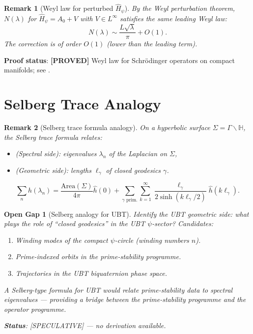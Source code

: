 \documentclass[11pt,a4paper]{article}
\newtheorem{remark}{Remark}
\newtheorem{gap}{Open Gap}
\newcommand{\proved}[1]{\textbf{[PROVED]} #1}
\begin{document}
\begin{remark}[Weyl law for perturbed $\hat{H}_\psi$]
  By the Weyl perturbation theorem, $N(\lambda)$ for $\hat{H}_\psi = A_0 + V$
  with $V \in L^\infty$ satisfies the same leading Weyl law:
  \[
    N(\lambda) \sim \frac{L\sqrt{\lambda}}{\pi} + O(1).
  \]
  The correction is of order $O(1)$ (lower than the leading term).
\end{remark}

\textbf{Proof status}: \proved{Weyl law for Schr\"odinger operators on compact
manifolds; see \cite[Ch.\ 13]{Berger}.}

\section{Selberg Trace Analogy}

\begin{remark}[Selberg trace formula analogy]
  On a hyperbolic surface $\Sigma = \Gamma\backslash\mathbb{H}$, the Selberg
  trace formula relates:
  \begin{itemize}
    \item (Spectral side): eigenvalues $\lambda_n$ of the Laplacian on $\Sigma$,
    \item (Geometric side): lengths $\ell_\gamma$ of closed geodesics $\gamma$.
  \end{itemize}
  \[
    \sum_n h(\lambda_n) = \frac{\mathrm{Area}(\Sigma)}{4\pi}\hat{h}(0)
    + \sum_{\gamma \text{ prim.}} \sum_{k=1}^\infty \frac{\ell_\gamma}{2\sinh(k\ell_\gamma/2)} \hat{h}(k\ell_\gamma).
  \]
\end{remark}

\begin{gap}[Selberg analogy for UBT]
  Identify the UBT geometric side: what plays the role of ``closed geodesics''
  in the UBT $\psi$-sector?  Candidates:
  \begin{enumerate}
    \item Winding modes of the compact $\psi$-circle (winding numbers $n$).
    \item Prime-indexed orbits in the prime-stability programme.
    \item Trajectories in the UBT biquaternion phase space.
  \end{enumerate}
  A Selberg-type formula for UBT would relate prime-stability data to
  spectral eigenvalues — providing a bridge between the prime-stability
  programme and the operator programme.

  \textbf{Status}: [SPECULATIVE] — no derivation available.
\end{gap}
\end{document}
